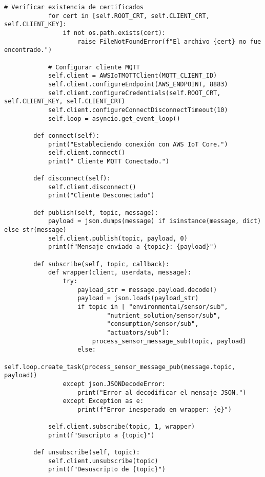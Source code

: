\begin{lstlisting}[label=cod:mqtt_connection,caption=Cliente MQTT, language=PythonUTF8]
            # Verificar existencia de certificados
            for cert in [self.ROOT_CRT, self.CLIENT_CRT, self.CLIENT_KEY]:
                if not os.path.exists(cert):
                    raise FileNotFoundError(f"El archivo {cert} no fue encontrado.")
    
            # Configurar cliente MQTT
            self.client = AWSIoTMQTTClient(MQTT_CLIENT_ID)
            self.client.configureEndpoint(AWS_ENDPOINT, 8883)
            self.client.configureCredentials(self.ROOT_CRT, self.CLIENT_KEY, self.CLIENT_CRT)
            self.client.configureConnectDisconnectTimeout(10)
            self.loop = asyncio.get_event_loop()
    
        def connect(self):
            print("Estableciendo conexión con AWS IoT Core.")
            self.client.connect()
            print(" Cliente MQTT Conectado.")
    
        def disconnect(self):
            self.client.disconnect()
            print("Cliente Desconectado")
    
        def publish(self, topic, message):
            payload = json.dumps(message) if isinstance(message, dict) else str(message)
            self.client.publish(topic, payload, 0)
            print(f"Mensaje enviado a {topic}: {payload}")
    
        def subscribe(self, topic, callback):
            def wrapper(client, userdata, message):
                try:
                    payload_str = message.payload.decode()
                    payload = json.loads(payload_str)
                    if topic in [ "environmental/sensor/sub", 
                            "nutrient_solution/sensor/sub", 
                            "consumption/sensor/sub", 
                            "actuators/sub"]:
                        process_sensor_message_sub(topic, payload)
                    else:
                        self.loop.create_task(process_sensor_message_pub(message.topic, payload))
                except json.JSONDecodeError:
                    print("Error al decodificar el mensaje JSON.")
                except Exception as e:
                    print(f"Error inesperado en wrapper: {e}")
            
            self.client.subscribe(topic, 1, wrapper)
            print(f"Suscripto a {topic}")
    
        def unsubscribe(self, topic):
            self.client.unsubscribe(topic)
            print(f"Desuscripto de {topic}")    
        \end{lstlisting}